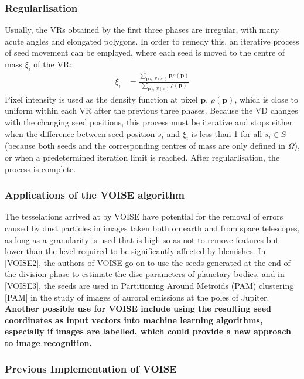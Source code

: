 \documentclass[12pt, report, a4paper, titlepage]{article}
\numberwithin{equation}{section}
\newcommand*{\citen}{}%
\DeclareRobustCommand*{\citen}[1]{%
  \begingroup
    \romannumeral-`\x %
    \setcitestyle{numbers}%
    \cite{#1}%
  \endgroup
}
\begin{document}
\subsubsection{Regularlisation}

Usually, the VRs obtained by the first three phases are irregular, with many acute angles and elongated polygons. In order to remedy this, an iterative process of seed movement can be employed, where each seed is moved to the centre of mass $\xi_i$ of the VR:
\begin{align}
	\xi_i &= \frac{\sum_{\textbf{p} \in \mathcal{R}(s_i)}\textbf{p} \rho(\textbf{p})}{\sum_{\textbf{p} \in \mathcal{R}(s_i)}\rho(\mathbf{p})}
\end{align}
Pixel intensity is used as the density function at pixel $\textbf{p}$, $\rho(\textbf{p})$, which is close to uniform within each VR after the previous three phases. Because the VD changes with the changing seed positions, this process must be iterative and stops either when the difference between seed position $s_i$ and $\xi_i$ is less than 1 for all $s_i \in S$ (because both seeds and the corresponding centres of mass are only defined in $\Omega$), or when a predetermined iteration limit is reached. After regularlisation, the process is complete.

\subsubsection{Applications of the VOISE algorithm}

The tesselations arrived at by VOISE have potential for the removal of errors caused by dust particles in images taken both on earth and from space telescopes, as long as a granularity is used that is high so as not to remove features but lower than the level required to be significantly affected by blemishes. In [\citen{VOISE2}], the authors of VOISE go on to use the seeds generated at the end of the division phase to estimate the disc parameters of planetary bodies, and in [\citen{VOISE3}], the seeds are used in Partitioning Around Metroids (PAM) clustering [\citen{PAM}] in the study of images of auroral emissions at the poles of Jupiter.
\textbf{Another possible use for VOISE include using the resulting seed coordinates as input vectors into machine learning algorithms, especially if images are labelled, which could provide a new approach to image recognition.}

\subsubsection{Previous Implementation of VOISE}
\end{document}
